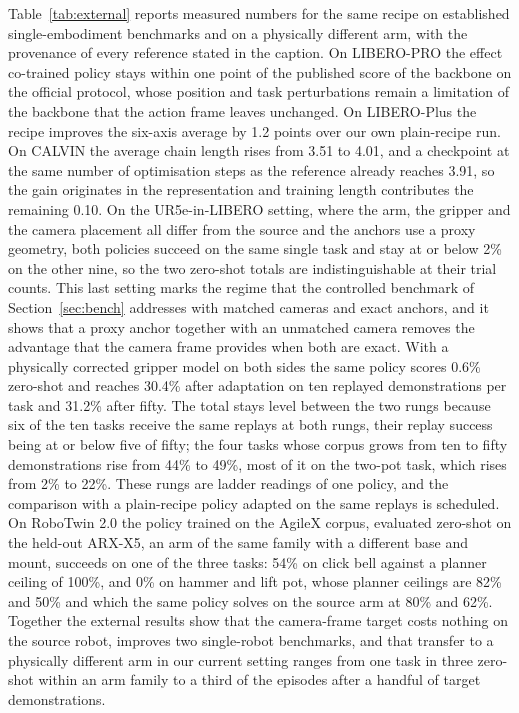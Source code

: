 Table~\ref{tab:external} reports measured numbers for the same recipe on established single-embodiment benchmarks and on a physically different arm, with the provenance of every reference stated in the caption. On LIBERO-PRO the effect co-trained policy stays within one point of the published score of the backbone on the official protocol, whose position and task perturbations remain a limitation of the backbone that the action frame leaves unchanged. On LIBERO-Plus the recipe improves the six-axis average by 1.2 points over our own plain-recipe run. On CALVIN the average chain length rises from 3.51 to 4.01, and a checkpoint at the same number of optimisation steps as the reference already reaches 3.91, so the gain originates in the representation and training length contributes the remaining 0.10. On the UR5e-in-LIBERO setting, where the arm, the gripper and the camera placement all differ from the source and the anchors use a proxy geometry, both policies succeed on the same single task and stay at or below 2\% on the other nine, so the two zero-shot totals are indistinguishable at their trial counts. This last setting marks the regime that the controlled benchmark of Section~\ref{sec:bench} addresses with matched cameras and exact anchors, and it shows that a proxy anchor together with an unmatched camera removes the advantage that the camera frame provides when both are exact. With a physically corrected gripper model on both sides the same policy scores 0.6\% zero-shot and reaches 30.4\% after adaptation on ten replayed demonstrations per task and 31.2\% after fifty. The total stays level between the two rungs because six of the ten tasks receive the same replays at both rungs, their replay success being at or below five of fifty; the four tasks whose corpus grows from ten to fifty demonstrations rise from 44\% to 49\%, most of it on the two-pot task, which rises from 2\% to 22\%. These rungs are ladder readings of one policy, and the comparison with a plain-recipe policy adapted on the same replays is scheduled. On RoboTwin 2.0 the policy trained on the AgileX corpus, evaluated zero-shot on the held-out ARX-X5, an arm of the same family with a different base and mount, succeeds on one of the three tasks: 54\% on click bell against a planner ceiling of 100\%, and 0\% on hammer and lift pot, whose planner ceilings are 82\% and 50\% and which the same policy solves on the source arm at 80\% and 62\%. Together the external results show that the camera-frame target costs nothing on the source robot, improves two single-robot benchmarks, and that transfer to a physically different arm in our current setting ranges from one task in three zero-shot within an arm family to a third of the episodes after a handful of target demonstrations.

